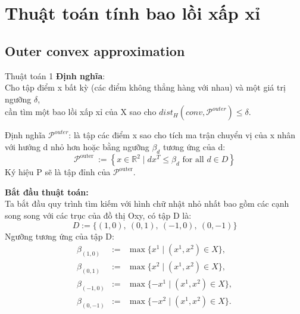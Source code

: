 \documentclass[11pt]{beamer}
\theoremstyle{definition}
\theoremstyle{plain}
\theoremstyle{plain}
\theoremstyle{remark}
\begin{document}
	
	\section{Thuật toán tính bao lồi xấp xỉ}
	\subsection{Outer convex approximation}
	\begin{frame}{Thuật toán 1}
		\textbf{Định nghĩa}: \\
		Cho tập điểm x bất kỳ (các điểm không thẳng hàng với nhau) và một giá trị ngưỡng $\delta$,\\
		cần tìm một bao lồi xấp xỉ của X sao cho $dist_H(conv, \mathcal{P}^{outer}) \leq \delta$.\\
		
	\end{frame}
	\begin{frame}
		Định nghĩa $\mathcal{P}^{outer}$: là tập các điểm x sao cho tích ma trận chuyển vị của x nhân với hướng d nhỏ hơn hoặc bằng ngưỡng $\beta_d$ tương ứng của d:
		\begin{equation}
			\mathcal{P}^{\text {outer }}:=\left\{x \in \mathbb{R}^2 \mid d x^T \leq \beta_d \text { for all } d \in D\right\}
		\end{equation}
		Ký hiệu P sẽ là tập đỉnh của $\mathcal{P}^{\text {outer}}$.
	\end{frame}
	\begin{frame}
		\textbf{Bắt đầu thuật toán:}\\
		Ta bắt đầu quy trình tìm kiếm với hình chữ nhật nhỏ nhất bao gồm các cạnh song song với các trục của đồ thị Oxy, có tập D là:\\
		\begin{equation}\label{def_D1}
			D := \{(1, 0),\ (0, 1),\ (-1, 0),\ (0, -1)\}
		\end{equation}
		Ngưỡng tương ứng của tập D:
		\begin{equation}\label{def_beta1}
			\begin{array}{lcl}
				\beta_{(1, 0)} &:=& \max\{x^1 \mid (x^1, x^2) \in X\}, \\
				\beta_{(0, 1)} &:=& \max\{x^2 \mid (x^1, x^2) \in X\}, \\
				\beta_{(-1, 0)} &:=& \max\{-x^1 \mid (x^1, x^2) \in X\}, \\
				\beta_{(0, -1)} &:=& \max\{-x^2 \mid (x^1, x^2) \in X\}.
			\end{array}
		\end{equation}
	\end{frame}
\end{document}
